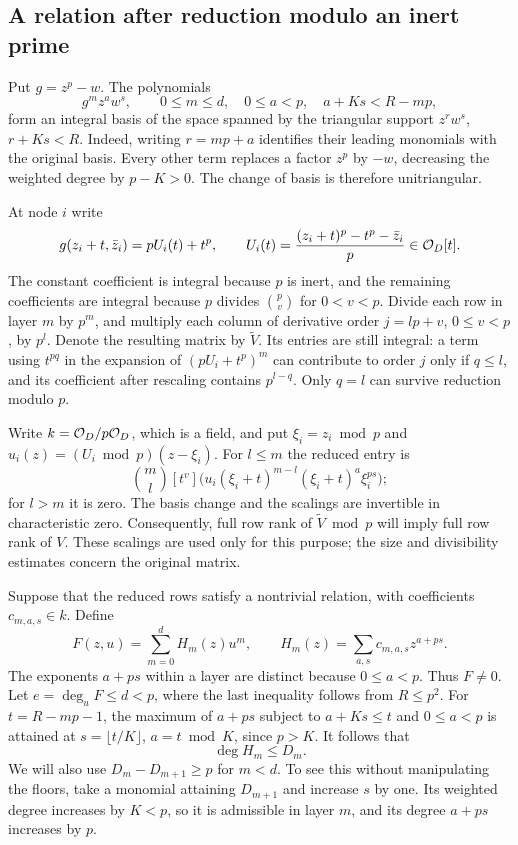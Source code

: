 \subsection{A relation after reduction modulo an inert prime}
Put $g=z^p-w$. The polynomials
\begin{equation}\label{eq:g-basis}
 g^m z^a w^s,\qquad
 0\leq m\leq d,\quad 0\leq a<p,\quad a+Ks<R-mp,
\end{equation}
form an integral basis of the space spanned by the triangular support
$z^rw^s$, $r+Ks<R$. Indeed, writing $r=mp+a$ identifies their leading
monomials with the original basis. Every other term replaces a factor
$z^p$ by $-w$, decreasing the weighted degree by $p-K>0$.
The change of basis is therefore unitriangular.

At node $i$ write
\[
 g(z_i+t,\bar z_i)=pU_i(t)+t^p,\qquad
 U_i(t)=\frac{(z_i+t)^p-t^p-\bar z_i}{p}\in\mathcal O_D[t].
\]
The constant coefficient is integral because $p$ is inert, and the remaining
coefficients are integral because $p$ divides $\binom pv$ for $0<v<p$.
Divide each row in layer $m$ by $p^m$, and multiply each column of derivative
order $j=lp+v$, $0\leq v<p$, by $p^l$. Denote the resulting matrix by
$\widetilde V$. Its entries are still integral: a term using $t^{pq}$ in
the expansion of $(pU_i+t^p)^m$ can contribute to order $j$ only if $q\leq l$,
and its coefficient after rescaling contains $p^{l-q}$.
Only $q=l$ can survive reduction modulo $p$.

Write $k=\mathcal O_D/p\mathcal O_D$, which is a field, and put
$\xi_i=z_i\bmod p$ and $u_i(z)=(U_i\bmod p)(z-\xi_i)$.
For $l\leq m$ the reduced entry is
\begin{equation}\label{eq:scaled-entry}
 \binom ml[t^v]\bigl(u_i(\xi_i+t)^{m-l}(\xi_i+t)^a\xi_i^{ps}\bigr);
\end{equation}
for $l>m$ it is zero. The basis change and the scalings are invertible in
characteristic zero. Consequently, full row rank of $\widetilde V\bmod p$
will imply full row rank of $V$. These scalings are used only for this
purpose; the size and divisibility estimates concern the original matrix.

Suppose that the reduced rows satisfy a nontrivial relation, with
coefficients $c_{m,a,s}\in k$. Define
\begin{equation}\label{eq:rank-F}
 F(z,u)=\sum_{m=0}^d H_m(z)u^m,\qquad
 H_m(z)=\sum_{a,s}c_{m,a,s}z^{a+ps}.
\end{equation}
The exponents $a+ps$ within a layer are distinct because $0\leq a<p$.
Thus $F\ne0$. Let $e=\deg_u F\leq d<p$, where the last inequality follows from
$R\leq p^2$.
For $t=R-mp-1$, the maximum of $a+ps$ subject to
$a+Ks\leq t$ and $0\leq a<p$ is attained at
$s=\lfloor t/K\rfloor$, $a=t\bmod K$, since $p>K$.
It follows that
\begin{equation}\label{eq:rank-degree}
 \deg H_m\leq D_m.
\end{equation}
We will also use $D_m-D_{m+1}\geq p$ for $m<d$.
To see this without manipulating the floors, take a monomial attaining
$D_{m+1}$ and increase $s$ by one. Its weighted degree increases by $K<p$,
so it is admissible in layer $m$, and its degree $a+ps$ increases by $p$.

